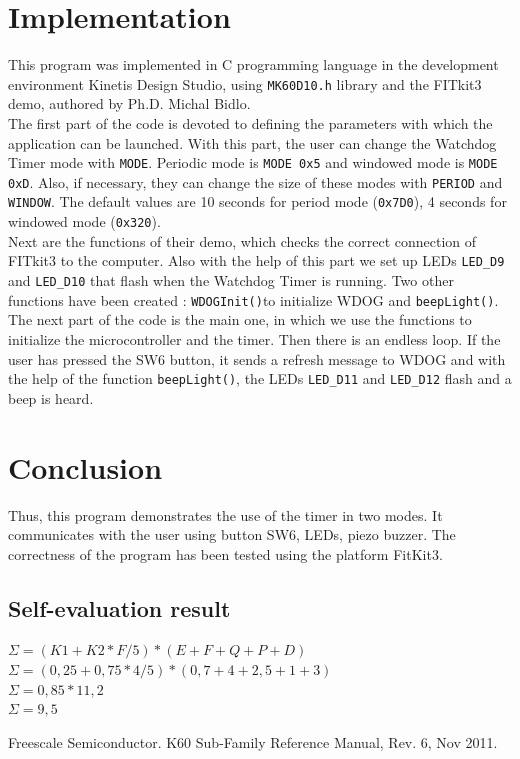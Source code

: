 \documentclass[a4paper, 12pt]{article}
\begin{document}
	\section{Implementation}
 This program was implemented in C programming language in the development environment Kinetis Design Studio, using \verb|MK60D10.h| library and the FITkit3 demo, authored by Ph.D. Michal Bidlo. \\ 
 The first part of the code is devoted to defining the parameters with which the application can be launched. With this part, the user can change the Watchdog Timer mode with \verb|MODE|. Periodic mode is \verb|MODE 0x5| and windowed mode is \verb|MODE 0xD|. Also, if necessary, they can change the size of these modes with \verb|PERIOD| and \verb|WINDOW|. The default values are  10 seconds for period mode (\verb|0x7D0|), 4 seconds for windowed mode (\verb|0x320|).\\
 Next are the functions of their demo, which checks the correct connection of FITkit3 to the computer. Also with the help of this part we set up LEDs \verb|LED_D9| and \verb|LED_D10| that flash when the Watchdog Timer is running.
Two other functions have been created : \verb|WDOGInit()|to initialize WDOG and \verb|beepLight()|. \\ 
The next part of the code is the main one, in which we use the functions to initialize the microcontroller and the timer. Then there is an endless loop. If the user has pressed the SW6 button, it sends a refresh message to WDOG and with the help of the function \verb|beepLight()|, the LEDs \verb|LED_D11| and \verb|LED_D12| flash and a beep is heard.
	\section{Conclusion}
Thus, this program demonstrates the use of the timer in two modes. It communicates with the user using button SW6, LEDs, piezo buzzer. The correctness of the program has been tested using the platform FitKit3.
\subsection{Self-evaluation result}
$\Sigma = (K1 + K2 * F/5) * (E + F + Q + P + D)$ \\
$\Sigma = (0,25 +  0,75 * 4/5) * (0,7 + 4 + 2,5 + 1 + 3)$ \\
$\Sigma = 0,85 * 11,2$ \\
$\Sigma = 9,5$\\

\begin{thebibliography}{9}
Freescale Semiconductor. K60 Sub-Family Reference Manual, Rev. 6, Nov 2011.
\end{thebibliography}
\end{document}
